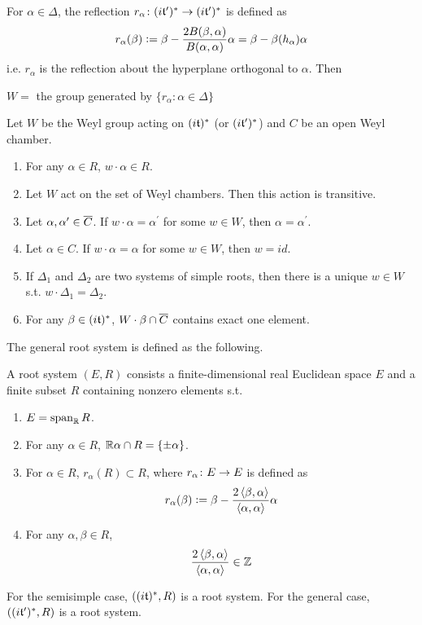 \documentclass[a4paper,12pt]{article}
\begin{document}
	For $\alpha \in \Delta$, the reflection $r_{\alpha} \colon (i\mathfrak{t}^{\prime})^* \rightarrow (i\mathfrak{t}^{\prime})^*$ is defined as
	\begin{equation*}
		r_{\alpha}(\beta) \vcentcolon= \beta - \frac{2B(\beta,\alpha)}{B(\alpha,\alpha)}\alpha  = \beta - \beta(h_{\alpha})\alpha
	\end{equation*}
	i.e. $r_{\alpha}$ is the reflection about the hyperplane orthogonal to $\alpha$. Then
	\begin{center}
		$W =$ the group generated by $\{r_{\alpha} \colon \alpha \in \Delta\}$
	\end{center}
	\begin{thm}
		Let $W$ be the Weyl group acting on $(i\mathfrak{t})^{*}$ (or $(i\mathfrak{t}^{\prime})^{*}$) and $C$ be an open Weyl chamber.
		\begin{enumerate}
			\item For any $\alpha \in R$, $w \cdot \alpha \in R$.
			\item Let  $W$ act on the set of Weyl chambers. Then this action is transitive.
			\item Let $\alpha,\alpha^{\prime} \in \overline{C}$. If $w \cdot \alpha =\alpha^{\prime}$ for some $w \in W$, then $\alpha=\alpha^{\prime}$.
			\item Let $\alpha \in C$. If $w \cdot \alpha = \alpha$ for some $w \in W$, then $w = id$.
			\item If $\Delta_1$ and $\Delta_2$ are two systems of simple roots, then there is a unique $w \in W$ s.t. $w \cdot \Delta_1 = \Delta_2$.
			\item For any $\beta  \in (i\mathfrak{t})^*$, $W \cdot \beta \cap \overline{C}$ contains exact one element.
		\end{enumerate}
	\end{thm}

	The general root system is defined as the following.
	\begin{defn}
		A root system $(E,R)$ consists a finite-dimensional real Euclidean space $E$ and a finite subset $R$ containing nonzero elements s.t.
		\begin{enumerate}
			\item $E = \operatorname{span}_{\mathbb{R}}R$.
			\item For any $\alpha \in R$, $\mathbb{R} \alpha \cap R = \left\{\pm \alpha\right\}$.
			\item For $\alpha \in R$,  $r_{\alpha}(R) \subset R$, where $r_{\alpha} \colon E \rightarrow E$ is defined as
			\begin{equation*}
				r_{\alpha}(\beta) \vcentcolon= \beta - \frac{2\left\langle \beta,\alpha \right\rangle}{\left\langle \alpha,\alpha \right\rangle}\alpha 
			\end{equation*}
			\item For any $\alpha,\beta \in R$,
			\begin{equation*}
				\frac{2\left\langle \beta,\alpha \right\rangle}{\left\langle \alpha,\alpha \right\rangle} \in \mathbb{Z}
			\end{equation*}
		\end{enumerate}
	\end{defn}
	\begin{rem}
		For the semisimple case, $((i\mathfrak{t})^*,R)$ is a root system. For the general case, $((i\mathfrak{t}^{\prime})^*,R)$ is a root system.
	\end{rem}
\end{document}
